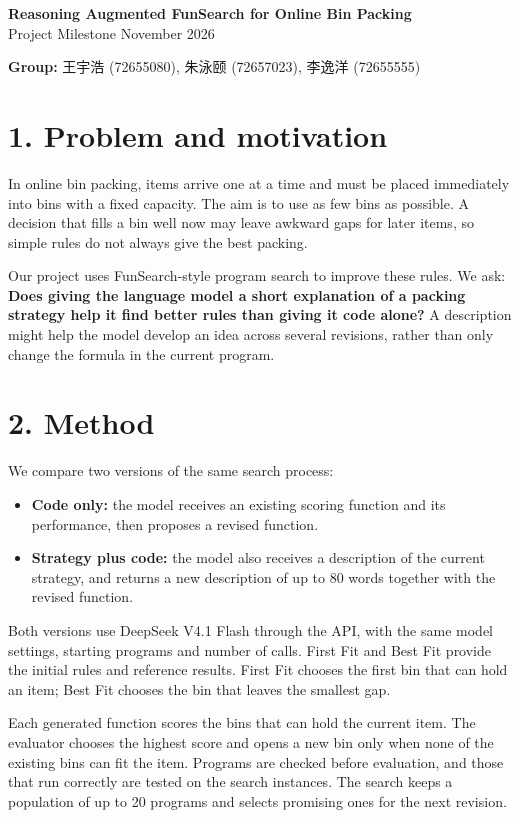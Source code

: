 \documentclass[12pt,a4paper]{article}
\begin{document}
\begin{center}
\textbf{Reasoning Augmented FunSearch for Online Bin Packing}\\[5pt]
Project Milestone\quad\textbar{} November 2026
\end{center}
\vspace{3pt}
\textbf{Group:} 王宇浩 (72655080), 朱泳颐 (72657023), 李逸洋 (72655555)

\section*{1. Problem and motivation}
In online bin packing, items arrive one at a time and must be placed immediately into bins with a fixed capacity. The aim is to use as few bins as possible. A decision that fills a bin well now may leave awkward gaps for later items, so simple rules do not always give the best packing.

Our project uses FunSearch-style program search to improve these rules. We ask: \textbf{Does giving the language model a short explanation of a packing strategy help it find better rules than giving it code alone?} A description might help the model develop an idea across several revisions, rather than only change the formula in the current program.

\section*{2. Method}
We compare two versions of the same search process:
\begin{itemize}
\item \textbf{Code only:} the model receives an existing scoring function and its performance, then proposes a revised function.
\item \textbf{Strategy plus code:} the model also receives a description of the current strategy, and returns a new description of up to 80 words together with the revised function.
\end{itemize}
Both versions use DeepSeek V4.1 Flash through the API, with the same model settings, starting programs and number of calls. First Fit and Best Fit provide the initial rules and reference results. First Fit chooses the first bin that can hold an item; Best Fit chooses the bin that leaves the smallest gap.

Each generated function scores the bins that can hold the current item. The evaluator chooses the highest score and opens a new bin only when none of the existing bins can fit the item. Programs are checked before evaluation, and those that run correctly are tested on the search instances. The search keeps a population of up to 20 programs and selects promising ones for the next revision.
\end{document}
